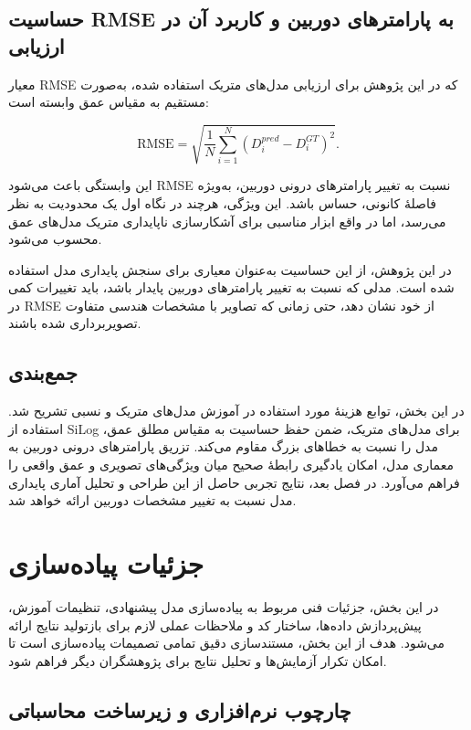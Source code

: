 \subsection{حساسیت RMSE به پارامترهای دوربین و کاربرد آن در ارزیابی}

معیار RMSE که در این پژوهش برای ارزیابی مدل‌های متریک استفاده شده، به‌صورت مستقیم به مقیاس عمق وابسته است:

\begin{equation}
\text{RMSE} = \sqrt{\frac{1}{N}\sum_{i=1}^{N} (D_i^{pred} - D_i^{GT})^2}.
\end{equation}

این وابستگی باعث می‌شود RMSE نسبت به تغییر پارامترهای درونی دوربین، به‌ویژه فاصلهٔ کانونی، حساس باشد. این ویژگی، هرچند در نگاه اول یک محدودیت به نظر می‌رسد، اما در واقع ابزار مناسبی برای آشکارسازی ناپایداری متریک مدل‌های عمق محسوب می‌شود.

در این پژوهش، از این حساسیت به‌عنوان معیاری برای سنجش پایداری مدل استفاده شده است. مدلی که نسبت به تغییر پارامترهای دوربین پایدار باشد، باید تغییرات کمی در RMSE از خود نشان دهد، حتی زمانی که تصاویر با مشخصات هندسی متفاوت تصویربرداری شده باشند.

\subsection{جمع‌بندی}

در این بخش، توابع هزینهٔ مورد استفاده در آموزش مدل‌های متریک و نسبی تشریح شد. استفاده از SiLog برای مدل‌های متریک، ضمن حفظ حساسیت به مقیاس مطلق عمق، مدل را نسبت به خطاهای بزرگ مقاوم می‌کند. تزریق پارامترهای درونی دوربین به معماری مدل، امکان یادگیری رابطهٔ صحیح میان ویژگی‌های تصویری و عمق واقعی را فراهم می‌آورد. در فصل بعد، نتایج تجربی حاصل از این طراحی و تحلیل آماری پایداری مدل نسبت به تغییر مشخصات دوربین ارائه خواهد شد.


\section{جزئیات پیاده‌سازی}
\label{sec:implementation_details}

در این بخش، جزئیات فنی مربوط به پیاده‌سازی مدل پیشنهادی، تنظیمات آموزش، پیش‌پردازش داده‌ها، ساختار کد و ملاحظات عملی لازم برای بازتولید نتایج ارائه می‌شود. هدف از این بخش، مستندسازی دقیق تمامی تصمیمات پیاده‌سازی است تا امکان تکرار آزمایش‌ها و تحلیل نتایج برای پژوهشگران دیگر فراهم شود.

\subsection{چارچوب نرم‌افزاری و زیرساخت محاسباتی}

